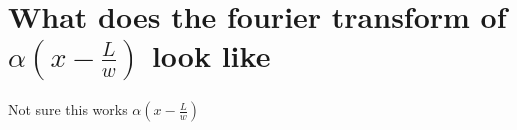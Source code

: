 \section{What does the fourier transform of $\alpha\left(x-\frac{L}{w}\right)$ look like}


Not sure this works $\alpha\left(x-\frac{L}{w}\right)$